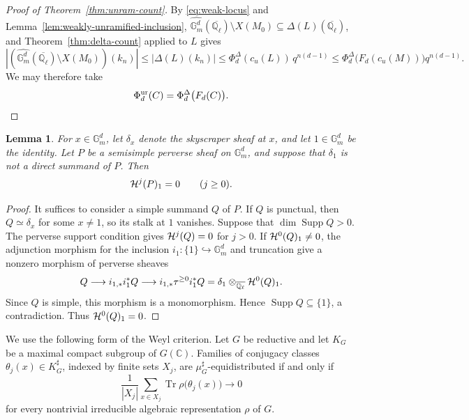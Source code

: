 \documentclass[12pt,reqno]{amsart}
\theoremstyle{definition}
\theoremstyle{plain}
\newtheorem{lem}[para]{Lemma}
\theoremstyle{definition}
\theoremstyle{remark}
\newcommand{\bbG}{\mathbb{G}}  \newcommand{\bbH}{\mathbb{H}}
\newcommand{\bbQ}{\mathbb{Q}}  \newcommand{\bbR}{\mathbb{R}}
\newcommand{\ol}[1]{\overline{#1}}
\newcommand{\Ql}{\bbQ_{\ell}}
\newcommand{\Gm}{\bbG_m}
\newcommand{\Supp}{\operatorname{Supp}}
\newcommand{\cu}{c_u}
\begin{document}
\begin{proof}[Proof of Theorem~\ref{thm:unram-count}]
By \eqref{eq:weak-locus} and Lemma~\ref{lem:weakly-unramified-inclusion},
\(\widehat{\Gm^d}(\ol\Ql)\setminus X(M_0)\subseteq\Delta(L)(\ol\Ql)\), and
Theorem~\ref{thm:delta-count} applied to \(L\) gives
\[
        |(\widehat{\Gm^d}(\ol\Ql)\setminus X(M_0))(k_n)|
        \le|\Delta(L)(k_n)|
        \le\Phi^\Delta_{d}(\cu(L))\,q^{n(d-1)}
        \le\Phi^\Delta_{d}\bigl(F_{d}(\cu(M))\bigr)q^{n(d-1)}.
\]
We may therefore take
\[
        \Phi^{\mathrm{ur}}_{d}(C)
        =\Phi^\Delta_{d}\bigl(F_{d}(C)\bigr).\qedhere
\]
\end{proof}

\begin{lem}
\label{lem:identity-stalk}
For \(x\in\Gm^d\), let \(\delta_x\) denote the skyscraper sheaf at \(x\), and let \(1\in\Gm^d\) be the
identity.
Let \(P\) be a semisimple perverse sheaf on \(\Gm^d\), and suppose that \(\delta_1\) is not a direct
summand of \(P\).  Then
\[
        \mathcal{H}^j(P)_1=0\qquad(j\ge0).
\]
\end{lem}

\begin{proof}
It suffices to consider a simple summand \(Q\) of \(P\).  If \(Q\) is punctual, then
\(Q\simeq\delta_x\) for some \(x\neq 1\), so its stalk at \(1\) vanishes.  Suppose that
\(\dim\Supp Q>0\).  The perverse support condition gives \(\mathcal{H}^j(Q)=0\) for \(j>0\).  If
\(\mathcal{H}^0(Q)_1\neq0\), the adjunction morphism for the inclusion \(i_1:\{1\}\hookrightarrow\Gm^d\) and
truncation give a nonzero morphism of perverse sheaves
\[
        Q\longrightarrow i_{1,*}i_1^*Q
        \longrightarrow i_{1,*}\tau^{\ge0}i_1^*Q
        =\delta_1\otimes_{\ol\Ql}\cH^0(Q)_1.
\]
Since \(Q\) is simple, this morphism is a monomorphism.  Hence \(\Supp Q\subseteq\{1\}\), a contradiction.
Thus \(\mathcal{H}^0(Q)_1=0\).
\end{proof}

We use the following form of the Weyl criterion.  Let \(G\) be reductive and let \(K_G\) be a maximal
compact subgroup of \(G(\mathbb C)\).  Families of conjugacy classes
\(\theta_j(x)\in K_G^\sharp\), indexed by finite sets \(X_j\), are
\(\mu_G^\sharp\)-equidistributed if and only if
\[
        \frac{1}{|X_j|}\sum_{x\in X_j}\operatorname{Tr}\rho\bigl(\theta_j(x)\bigr)\longrightarrow0
\]
for every nontrivial irreducible algebraic representation \(\rho\) of \(G\).  
\end{document}
